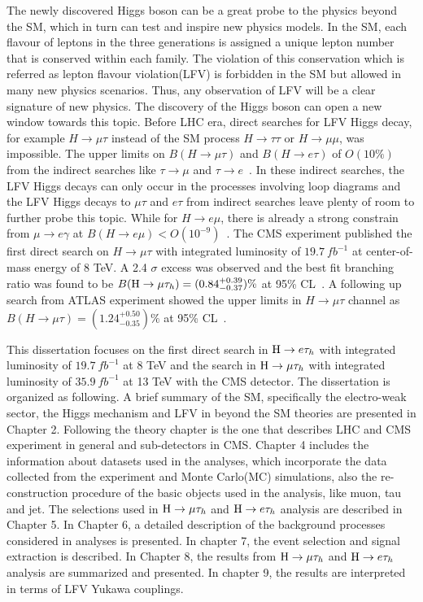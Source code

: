 The newly discovered Higgs boson can be a great probe to the physics beyond the SM, which in turn can test and inspire new physics models. In the SM, each flavour of leptons in the three generations is assigned a unique lepton number that is conserved within each family. The violation of this conservation which is referred as lepton flavour violation(LFV) is forbidden in the SM but allowed in many new physics scenarios. Thus, any observation of LFV will be a clear signature of new physics. The discovery of the Higgs boson can open a new window towards this topic. Before LHC era, direct searches for LFV Higgs decay, for example $H \to \mu\tau$ instead of the SM process $H \to \tau\tau$ or $H \to \mu\mu$, was impossible. The upper limits on $B(H \to \mu \tau)$ and $B(H \to e \tau)$ of $O(10\%)$~\cite{Blankenburg:2012ex,Harnik2012pb} from the indirect searches like $\tau \to \mu$ and $\tau \to e$~\cite{Celis:2013xja}. In these indirect searches, the LFV Higgs decays can only occur in the processes involving loop diagrams and the LFV Higgs decays to $\mu\tau$ and $e\tau$ from indirect searches leave plenty of room to further probe this topic. While for $H \to e\mu$, there is already a strong constrain from $\mu \to e\gamma$ at $B(H\to e \mu)<O(10^{-9})$~\cite{TheMEG2016wtm}. The CMS experiment published the first direct search on $H \to \mu \tau$ with integrated luminosity of $19.7~ fb^{-1}$ at center-of-mass energy of 8 TeV. A 2.4 $\sigma$ excess was observed and the best fit branching ratio was found to be $B(\mathrm{H}\to \mu\tau_{h})=(0.84^{+0.39}_{-0.37})\%$ at 95\% CL~\cite{2015337}. A following up search from ATLAS experiment showed the upper limits in $H \to \mu \tau$ channel as $B(H \to \mu \tau)=(1.24^{+0.50}_{-0.35})\%$ at 95\% CL~\cite{Aad2015gha}.
  

This dissertation focuses on the first direct search in $\mathrm{H} \to e \tau_{h}$ with integrated luminosity of $19.7 ~fb^{-1}$ at 8 TeV and the search in $\mathrm{H}\to \mu\tau_{h}$ with integrated luminosity of $35.9~ fb^{-1}$ at 13 TeV with the CMS detector. The dissertation is organized as following. A brief summary of the SM, specifically the electro-weak sector, the Higgs mechanism and LFV in beyond the SM theories are presented in Chapter 2. Following the theory chapter is the one that describes LHC and CMS experiment in general and sub-detectors in CMS. Chapter 4 includes the information about datasets used in the analyses, which incorporate the data collected from the experiment and Monte Carlo(MC) simulations, also the re-construction procedure of the basic objects used in the analysis, like muon, tau and jet. The selections used in $\mathrm{H}\to \mu\tau_{h}$ and $\mathrm{H} \to e \tau_{h}$ analysis are described in Chapter 5. In Chapter 6, a detailed description of the background processes considered in analyses is presented.  In chapter 7, the event selection and signal  extraction is described. In Chapter 8, the results from $\mathrm{H}\to \mu\tau_{h}$ and $\mathrm{H} \to e \tau_{h}$ analysis are summarized and presented. In chapter 9, the results are interpreted in terms of LFV Yukawa couplings.





